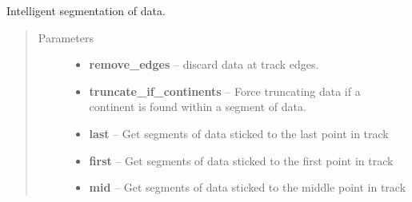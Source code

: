 \documentclass[letterpaper,10pt,english]{sphinxmanual}
\begin{document}
\begin{fulllineitems}
\label{altimetry.tools.spectrum:altimetry.tools.spectrum.get_segment}
Intelligent segmentation of data.
\begin{quote}\begin{description}
\item[{Parameters}] \leavevmode\begin{itemize}
\item {} 
\textbf{remove\_edges} -- discard data at track edges.

\item {} 
\textbf{truncate\_if\_continents} -- Force truncating data if a continent is found within a segment of data.

\item {} 
\textbf{last} -- Get segments of data sticked to the last point in track

\item {} 
\textbf{first} -- Get segments of data sticked to the first point in track

\item {} 
\textbf{mid} -- Get segments of data sticked to the middle point in track

\end{itemize}

\end{description}\end{quote}

\end{fulllineitems}

\end{document}
